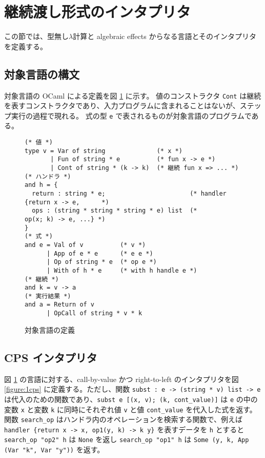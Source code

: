 \section{継続渡し形式のインタプリタ}
\label{section:definition}

この節では、型無し$\lambda$計算と algebraic effects からなる言語とそのインタプリタを定義する。

\subsection{対象言語の構文}
\label{subsection:syntax}

対象言語の OCaml による定義を図 \ref{figure:syntax} に示す。
値のコンストラクタ \texttt{Cont} は継続を表すコンストラクタであり、入力プログラムに含まれることはないが、ステップ実行の過程で現れる。
式の型 \texttt{e} で表されるものが対象言語のプログラムである。

\begin{figure}
\begin{verbatim}
(* 値 *)
type v = Var of string              (* x *)
       | Fun of string * e          (* fun x -> e *)
       | Cont of string * (k -> k)  (* 継続 fun x => ... *)
(* ハンドラ *)
and h = {
  return : string * e;                       (* handler {return x -> e,      *)
  ops : (string * string * string * e) list  (*          op(x; k) -> e, ...} *)
}
(* 式 *)
and e = Val of v          (* v *)
      | App of e * e      (* e e *)
      | Op of string * e  (* op e *)
      | With of h * e     (* with h handle e *)
(* 継続 *)
and k = v -> a
(* 実行結果 *)
and a = Return of v
      | OpCall of string * v * k

\end{verbatim}
\caption{対象言語の定義}
\label{figure:syntax}
\end{figure}

\subsection{CPS インタプリタ}

図 \ref{figure:syntax} の言語に対する、call-by-value かつ right-to-left のインタプリタを図 \ref{figure:1cps} に定義する。ただし、関数 \texttt{subst : e -> (string * v) list -> e} は代入のための関数であり、\texttt{subst e [(x, v); (k, cont\_value)]} は \texttt{e} の中の変数 \texttt{x} と変数 \texttt{k} に同時にそれぞれ値 \texttt{v} と値 \texttt{cont\_value} を代入した式を返す。関数 \texttt{search\_op} はハンドラ内のオペレーションを検索する関数で、例えば \texttt{handler \{return x -> x, op1(y, k) -> k y\}} を表すデータを \texttt{h} とすると \texttt{search\_op "op2" h} は \texttt{None} を返し \texttt{search\_op "op1" h} は \texttt{Some (y, k, App (Var "k", Var "y"))} を返す。

